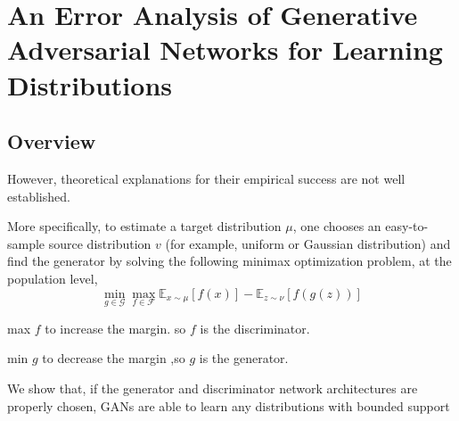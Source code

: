 
\chapter{An Error Analysis of Generative Adversarial Networks for
Learning Distributions}
\section*{Overview}




However, theoretical explanations for
their empirical success are not well established.

More specifically,
to estimate a target distribution $\mu$, one chooses an easy-to-sample source distribution $v$ (for
example, uniform or Gaussian distribution) and find the generator by solving the following
minimax optimization problem, at the population level,
$$
\min _{g \in \mathcal{G}} \max _{f \in \mathcal{F}} \mathbb{E}_{x \sim \mu}[f(x)]-\mathbb{E}_{z \sim \nu}[f(g(z))]$$


max $f$ to increase the margin. so $f$ is the discriminator.

min $g$ to decrease the margin ,so $g$ is the generator.


We show that, if the generator and discriminator network architectures
are properly chosen, GANs are able to learn any distributions with bounded support